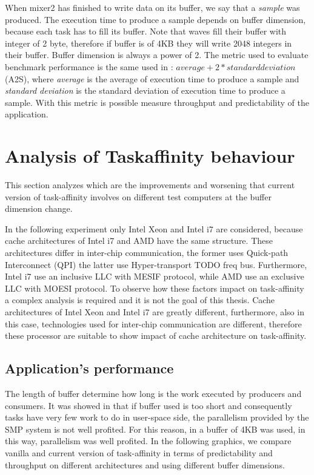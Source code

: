 When mixer2 has finished to write data on its buffer, we say that a \textit{sample} was produced. The execution time to produce a sample depends on buffer 
dimension, because each task has to fill its buffer. Note that waves fill their buffer with integer of 2 byte, therefore if buffer is of 4KB they will
write 2048 integers in their buffer. Buffer dimension is always a power of 2.
The metric used to evaluate benchmark performance is the same used in \cite{lcs}: $average + 2*standard deviation$ (A2S), where \textit{average} is the 
average of execution time to produce a sample and \textit{standard deviation} is the standard deviation of execution time to produce a sample. With this 
metric is possible measure throughput and predictability of the application.

\section{Analysis of Taskaffinity behaviour}

This section analyzes which are the improvements and worsening that current version of task-affinity involves on different test computers at the buffer 
dimension change.

In the following experiment only Intel Xeon and Intel i7 are considered, because cache architectures of Intel i7 and AMD have the same structure.
These architectures differ in inter-chip communication, the former uses Quick-path Interconnect (QPI) the latter use Hyper-transport TODO freq bus. 
Furthermore, Intel i7 use an inclusive LLC with MESIF protocol, while AMD use an exclusive LLC with MOESI protocol. To observe how these factors impact 
on task-affinity a complex analysis is required and it is not the goal of this thesis. Cache architectures of Intel Xeon and Intel i7 are greatly 
different, furthermore, also in this case, technologies used for inter-chip communication are different, therefore these processor are suitable to show 
impact of cache architecture on task-affinity.

\subsection{Application's performance}

The length of buffer determine how long is the work executed by producers and consumers. It was showed in \cite{lcs} that if buffer used is too short and 
consequently tasks have very few work to do in user-space side, the parallelism provided by the SMP system is not well profited. For this reason, in 
\cite{lcs} a buffer of 4KB was used, in this way, parallelism was well profited. In the following graphics, we compare vanilla and current version 
of task-affinity in terms of predictability and throughput on different architectures and using different buffer dimensions.

